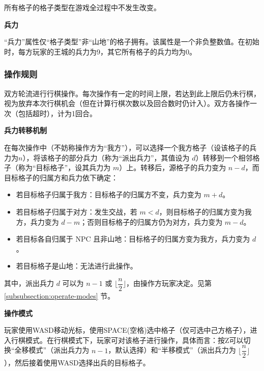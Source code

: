所有格子的格子类型在游戏全过程中不发生改变。

\noindent \textbf{兵力}

“兵力”属性仅“格子类型”非“山地”的格子拥有。该属性是一个非负整数值。在初始时，每方玩家的王城的兵力为9，其它所有格子的兵力均为0。


\subsubsection{操作规则} \label{subsubsection:operate-rules}
双方轮流进行行棋操作。每次操作有一定的时间上限，若达到此上限后仍未行棋，视为放弃本次行棋机会（但在计算行棋次数以及回合数时仍计入）。双方各操作一次（包括超时），计为1回合。

\noindent \textbf{兵力转移机制}

在每次操作中（不妨称操作方为“我方”），可以选择一个我方格子（设该格子的兵力为$n$），将该格子的部分兵力（称为“派出兵力”，其值设为 $d$）转移到一个相邻格子（称为“目标格子”，设其兵力为 $m$）上。转移后，源格子的兵力变为 $n-d$，而目标格子的归属方和兵力依下确定：

\begin{itemize}
    \item 若目标格子归属于我方：目标格子的归属方不变，兵力变为 $m+d$。
    \item 若目标格子归属于对方：发生交战，若 $m < d$，则目标格子的归属方变为我方，兵力变为 $d-m$；否则目标格子的归属方仍为对方，兵力变为 $m-d$。 
    \item 若目标各自归属于 NPC 且非山地：目标格子的归属方变为我方，兵力变为 $d$。
    \item 若目标格子是山地：无法进行此操作。
\end{itemize}

其中，派出兵力 $d$ 可以为 $n-1$ 或 $\lfloor \dfrac{n}{2} \rfloor$，由操作方玩家决定。见第 \ref{subsubsection:operate-modes} 节。



\noindent \textbf{操作模式} \label{subsubsection:operate-modes}

玩家使用WASD移动光标，使用SPACE(空格)选中格子（仅可选中己方格子），进入行棋模式。在行棋模式下，玩家可对该格子进行操作，具体而言：按Z可以切换“全移模式”（派出兵力为 $n-1$，默认选择）和“半移模式”（派出兵力为 $\lfloor \dfrac{n}{2} \rfloor$），然后接着使用WASD选择出兵的目标格子。


